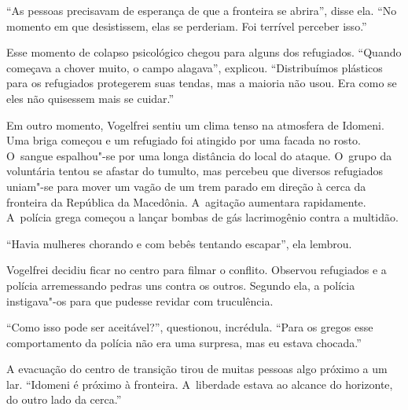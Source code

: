 ``As pessoas precisavam de esperança de que a fronteira se abrira'',
disse ela. ``No momento em que desistissem, elas se perderiam. Foi
terrível perceber isso.''

Esse momento de colapso psicológico chegou para alguns dos refugiados.
``Quando começava a chover muito, o campo alagava'', explicou.
``Distribuímos plásticos para os refugiados protegerem suas tendas, mas
a maioria não usou. Era como se eles não quisessem mais se cuidar.''

Em outro momento, Vogelfrei sentiu um clima tenso na atmosfera de
Idomeni. Uma briga começou e um refugiado foi atingido por uma facada no
rosto. O~sangue espalhou"-se  por uma longa distância do local do
ataque. O~grupo da voluntária tentou se afastar do tumulto, mas percebeu
que diversos refugiados uniam"-se para mover um vagão de um trem parado
em direção à cerca da fronteira da República da Macedônia. A~agitação
aumentara rapidamente. A~polícia grega começou a lançar bombas de gás
lacrimogênio contra a multidão.

``Havia mulheres chorando e com bebês tentando escapar'', ela lembrou.

Vogelfrei decidiu ficar no centro para filmar o conflito. Observou
refugiados e a polícia arremessando pedras uns contra os outros. Segundo ela, a polícia instigava"-os para que pudesse revidar com truculência.

``Como isso pode ser aceitável?'', questionou, incrédula. ``Para os
gregos esse comportamento da polícia não era uma surpresa, mas eu estava
chocada.''

A evacuação do centro de transição tirou de muitas pessoas algo próximo
a um lar. ``Idomeni é próximo à fronteira. A~liberdade estava ao alcance
do horizonte, do outro lado da cerca.''
